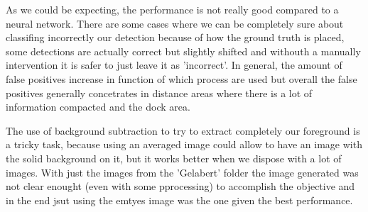 \documentclass[10pt]{article}
\begin{document}
As we could be expecting, the performance is not really good compared to a neural network. There are some cases where we can be completely sure about classifing incorrectly our detection because of how the ground truth is placed, some detections are actually correct but slightly shifted and withouth a manually intervention it is safer to just leave it as 'incorrect'. In general, the amount of false positives increase in function of which process are used but overall the false positives generally concetrates in distance areas where there is a lot of information compacted and the dock area.\newline

The use of background subtraction to try to extract completely our foreground is a tricky task, because using an averaged image could allow to have an image with the solid background on it, but it works better when we dispose with a lot of images. With just the images from the 'Gelabert' folder the image generated was not clear enought (even with some pprocessing) to accomplish the objective and in the end jsut using the emtyes image was the one given the best performance.\newline

\end{document}
